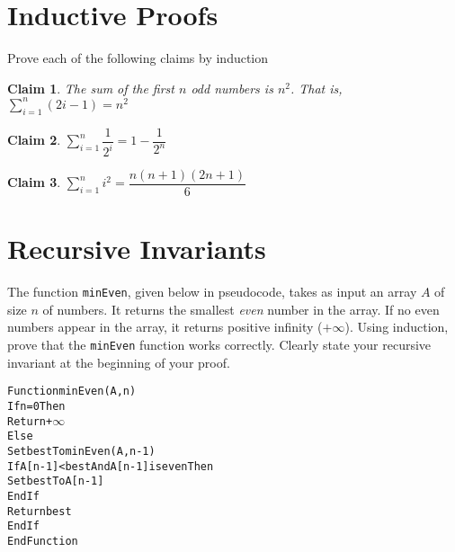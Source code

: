 \documentclass{article}
\newtheorem{claim}{Claim}
\begin{document}
    \section{Inductive Proofs}

    Prove each of the following claims by induction

    \begin{claim}
      The sum of the first $n$ odd numbers is $n^2$.  That is, $\sum\limits_{i=1}^n (2i-1) = n^2$
    \end{claim}



    \begin{claim}
      $\sum\limits_{i=1}^{n} \dfrac{1}{2^i} = 1 - \dfrac{1}{2^n}$
    \end{claim}



    \begin{claim}
      $\sum\limits_{i=1}^{n} i^2 = \dfrac{n(n+1)(2n+1)}{6}$
    \end{claim}



    \vspace{1cm}
    \section{Recursive Invariants}
    
    The function \texttt{minEven}, given below in pseudocode, takes as input an array $A$ of size $n$ of numbers.  It returns the smallest \textit{even} number in the array.  If no even numbers appear in the array, it returns positive infinity ($+\infty$).  Using induction, prove that the \texttt{minEven} function works correctly.  Clearly state your recursive invariant at the beginning of your proof.

    \begin{alltt}
Function minEven(A,n)
  If n = 0 Then
    Return +\ensuremath{\infty}
  Else
    Set best To minEven(A,n-1)
    If A[n-1] < best And A[n-1] is even Then
      Set best To A[n-1]
    EndIf
    Return best
  EndIf
EndFunction
    \end{alltt}

\end{document}
